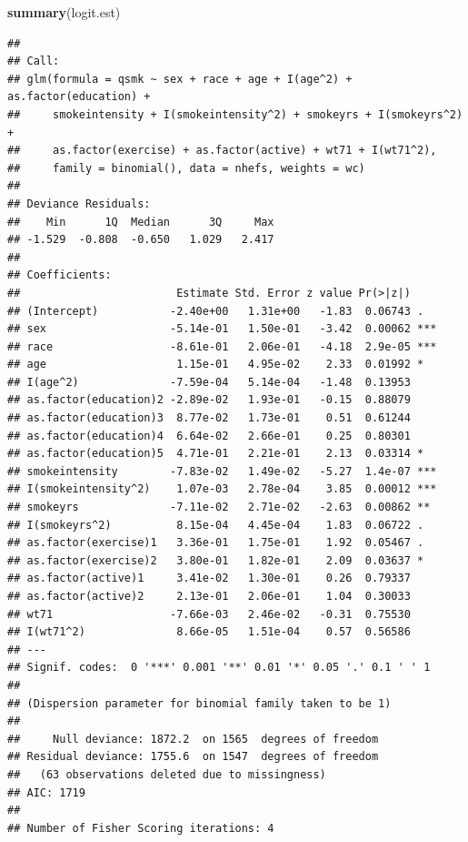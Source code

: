 \documentclass[
  10pt,
]{book}
\newenvironment{Shaded}{\begin{snugshade}}{\end{snugshade}}
\newcommand{\KeywordTok}[1]{\textcolor[rgb]{0.13,0.29,0.53}{\textbf{#1}}}
\newcommand{\NormalTok}[1]{#1}
\begin{document}
\begin{Shaded}
\begin{Highlighting}[]
\KeywordTok{summary}\NormalTok{(logit.est)}
\end{Highlighting}
\end{Shaded}

\begin{verbatim}
## 
## Call:
## glm(formula = qsmk ~ sex + race + age + I(age^2) + as.factor(education) + 
##     smokeintensity + I(smokeintensity^2) + smokeyrs + I(smokeyrs^2) + 
##     as.factor(exercise) + as.factor(active) + wt71 + I(wt71^2), 
##     family = binomial(), data = nhefs, weights = wc)
## 
## Deviance Residuals: 
##    Min      1Q  Median      3Q     Max  
## -1.529  -0.808  -0.650   1.029   2.417  
## 
## Coefficients:
##                        Estimate Std. Error z value Pr(>|z|)    
## (Intercept)           -2.40e+00   1.31e+00   -1.83  0.06743 .  
## sex                   -5.14e-01   1.50e-01   -3.42  0.00062 ***
## race                  -8.61e-01   2.06e-01   -4.18  2.9e-05 ***
## age                    1.15e-01   4.95e-02    2.33  0.01992 *  
## I(age^2)              -7.59e-04   5.14e-04   -1.48  0.13953    
## as.factor(education)2 -2.89e-02   1.93e-01   -0.15  0.88079    
## as.factor(education)3  8.77e-02   1.73e-01    0.51  0.61244    
## as.factor(education)4  6.64e-02   2.66e-01    0.25  0.80301    
## as.factor(education)5  4.71e-01   2.21e-01    2.13  0.03314 *  
## smokeintensity        -7.83e-02   1.49e-02   -5.27  1.4e-07 ***
## I(smokeintensity^2)    1.07e-03   2.78e-04    3.85  0.00012 ***
## smokeyrs              -7.11e-02   2.71e-02   -2.63  0.00862 ** 
## I(smokeyrs^2)          8.15e-04   4.45e-04    1.83  0.06722 .  
## as.factor(exercise)1   3.36e-01   1.75e-01    1.92  0.05467 .  
## as.factor(exercise)2   3.80e-01   1.82e-01    2.09  0.03637 *  
## as.factor(active)1     3.41e-02   1.30e-01    0.26  0.79337    
## as.factor(active)2     2.13e-01   2.06e-01    1.04  0.30033    
## wt71                  -7.66e-03   2.46e-02   -0.31  0.75530    
## I(wt71^2)              8.66e-05   1.51e-04    0.57  0.56586    
## ---
## Signif. codes:  0 '***' 0.001 '**' 0.01 '*' 0.05 '.' 0.1 ' ' 1
## 
## (Dispersion parameter for binomial family taken to be 1)
## 
##     Null deviance: 1872.2  on 1565  degrees of freedom
## Residual deviance: 1755.6  on 1547  degrees of freedom
##   (63 observations deleted due to missingness)
## AIC: 1719
## 
## Number of Fisher Scoring iterations: 4
\end{verbatim}
\end{document}
